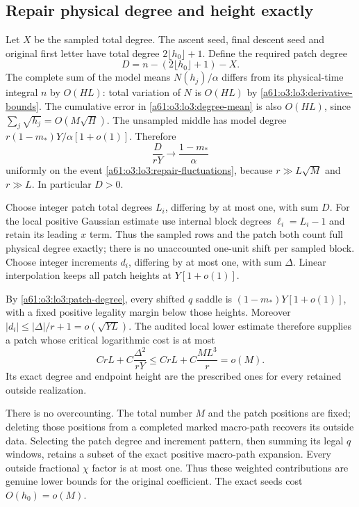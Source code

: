 \documentclass[11pt,letterpaper]{article}
\numberwithin{equation}{section}
\theoremstyle{remark}\newtheorem{remark}[theorem]{Remark}
\begin{document}
\subsection{Repair physical degree and height exactly}

Let $X$ be the sampled total degree. The ascent seed, final descent
seed and original first letter have total degree
$2\lfloor h_0\rfloor+1$. Define the required patch degree
\[
 D=n-(2\lfloor h_0\rfloor+1)-X.
\]
The complete sum of the model means $N(h_j)/\alpha$ differs from its
physical-time integral $n$ by $O(HL)$: total variation of $N$ is
$O(HL)$ by \eqref{a61:o3:lo3:derivative-bounds}. The cumulative error in
\eqref{a61:o3:lo3:degree-mean} is also $O(HL)$, since
$\sum_j\sqrt{h_j}=O(M\sqrt H)$.
The unsampled middle has model degree
$r(1-m_*)Y/\alpha[1+o(1)]$. Therefore
\begin{equation}\label{a61:o3:lo3:patch-degree}
 \frac D{rY}\longrightarrow\frac{1-m_*}\alpha
\end{equation}
uniformly on the event \eqref{a61:o3:lo3:repair-fluctuations}, because
$r\gg L\sqrt M$ and $r\gg L$. In particular $D>0$.

Choose integer patch total degrees $L_i$, differing by at most one,
with sum $D$. For the local positive Gaussian estimate use internal
block degrees $\ell_i=L_i-1$ and retain its leading $x$ term.
Thus the sampled rows and the patch both count full physical degree
exactly; there is no unaccounted one-unit shift per sampled block.
Choose integer increments $d_i$, differing by at most one, with
sum $\Delta$. Linear interpolation keeps all patch heights at
$Y[1+o(1)]$.

By \eqref{a61:o3:lo3:patch-degree}, every shifted $q$ saddle is
$(1-m_*)Y[1+o(1)]$, with a fixed positive legality margin below
those heights. Moreover
$|d_i|\le |\Delta|/r+1=o(\sqrt{YL})$.
The audited local lower estimate therefore supplies a patch whose
critical logarithmic cost is at most
\begin{equation}\label{a61:o3:lo3:patch-cost}
 CrL+C\frac{\Delta^2}{rY}
    \le CrL+C\frac{ML^3}{r}=o(M).
\end{equation}
Its exact degree and endpoint height are the prescribed ones for
every retained outside realization.

There is no overcounting. The total number $M$ and the patch positions
are fixed; deleting those positions from a completed marked
macro-path recovers its outside data. Selecting the patch degree and
increment pattern, then summing its legal $q$ windows, retains a
subset of the exact positive macro-path expansion. Every outside
fractional $\chi$ factor is at most one. Thus these weighted
contributions are genuine lower bounds for the original coefficient.
The exact seeds cost $O(h_0)=o(M)$.
\end{document}
